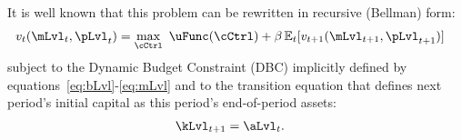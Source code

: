 It is well known that this problem can be rewritten in recursive (Bellman) form:
  \begin{equation}\begin{gathered}\begin{aligned}
        \vFunc_{\prd}(\mLvl_{\prd},\pLvl_{\prd})  & = \max_{\cCtrl}~ \uFunc(\cCtrl) + \DiscFac \Ex_{\prd}[ \vFunc_{\prd+1}(\mLvl_{\prd+1},\pLvl_{\prd+1})]\label{eq:vrecurse}
      \end{aligned}\end{gathered}\end{equation}
subject to the Dynamic Budget Constraint (DBC) implicitly defined by equations~\eqref{eq:bLvl}-\eqref{eq:mLvl} and to the transition equation that defines next period's initial capital as this period's end-of-period assets:
\begin{equation}\begin{gathered}\begin{aligned}
      \kLvl_{\prd+1} & = \aLvl_{\prd}. \label{eq:transitionstate}
    \end{aligned}\end{gathered}\end{equation}


